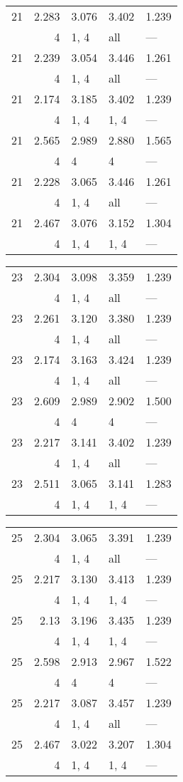 \begin{tabular}{lrlll}
\toprule
 21 & 2.283 & 3.076 & 3.402 & 1.239 \\
    & 4     & 1, 4  & all   & ---   \\
 21 & 2.239 & 3.054 & 3.446 & 1.261 \\
    & 4     & 1, 4  & all   & ---   \\
 21 & 2.174 & 3.185 & 3.402 & 1.239 \\
    & 4     & 1, 4  & 1, 4  & ---   \\
 21 & 2.565 & 2.989 & 2.880 & 1.565 \\
    & 4     & 4     & 4     & ---   \\
 21 & 2.228 & 3.065 & 3.446 & 1.261 \\
    & 4     & 1, 4  & all   & ---   \\
 21 & 2.467 & 3.076 & 3.152 & 1.304 \\
    & 4     & 1, 4  & 1, 4  & ---   \\
\bottomrule
\end{tabular}
\begin{tabular}{lrlll}
\toprule
 23 & 2.304 & 3.098 & 3.359 & 1.239 \\
    & 4     & 1, 4  & all   & ---   \\
 23 & 2.261 & 3.120 & 3.380 & 1.239 \\
    & 4     & 1, 4  & all   & ---   \\
 23 & 2.174 & 3.163 & 3.424 & 1.239 \\
    & 4     & 1, 4  & all   & ---   \\
 23 & 2.609 & 2.989 & 2.902 & 1.500 \\
    & 4     & 4     & 4     & ---   \\
 23 & 2.217 & 3.141 & 3.402 & 1.239 \\
    & 4     & 1, 4  & all   & ---   \\
 23 & 2.511 & 3.065 & 3.141 & 1.283 \\
    & 4     & 1, 4  & 1, 4  & ---   \\
\bottomrule
\end{tabular}
\begin{tabular}{lrlll}
\toprule
 25 & 2.304 & 3.065 & 3.391 & 1.239 \\
    & 4     & 1, 4  & all   & ---   \\
 25 & 2.217 & 3.130 & 3.413 & 1.239 \\
    & 4     & 1, 4  & 1, 4  & ---   \\
 25 & 2.13  & 3.196 & 3.435 & 1.239 \\
    & 4     & 1, 4  & 1, 4  & ---   \\
 25 & 2.598 & 2.913 & 2.967 & 1.522 \\
    & 4     & 4     & 4     & ---   \\
 25 & 2.217 & 3.087 & 3.457 & 1.239 \\
    & 4     & 1, 4  & all   & ---   \\
 25 & 2.467 & 3.022 & 3.207 & 1.304 \\
    & 4     & 1, 4  & 1, 4  & ---   \\
\bottomrule
\end{tabular}
